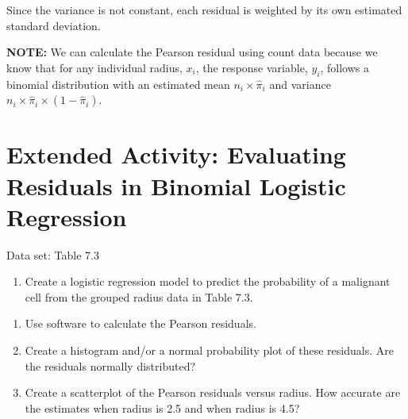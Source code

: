 \documentclass[
]{report}
\providecommand{\tightlist}{%
  \setlength{\itemsep}{0pt}\setlength{\parskip}{0pt}}
\begin{document}
Since the variance is not constant, each residual is weighted by its own estimated standard deviation.

\large

\textbf{NOTE:}
We can calculate the Pearson residual using count data because we know that for any individual radius, \(x_i\), the response variable, \(y_i\), follows a binomial distribution with an estimated mean \(n_i \times \hat\pi_i\) and variance \(n_i \times \hat\pi_i \times (1 - \hat\pi_i)\).\\
\normalsize

\hypertarget{extended-activity-evaluating-residuals-in-binomial-logistic-regression-1}{%
\section*{Extended Activity: Evaluating Residuals in Binomial Logistic Regression}\label{extended-activity-evaluating-residuals-in-binomial-logistic-regression-1}}

Data set: Table 7.3

\begin{enumerate}
\def\labelenumi{\arabic{enumi}.}
\setcounter{enumi}{26}
\tightlist
\item
  Create a logistic regression model to predict the probability of a malignant cell from the grouped radius data in Table 7.3.\\
\end{enumerate}

\begin{enumerate}
\def\labelenumi{\alph{enumi}.}
\tightlist
\item
  Use software to calculate the Pearson residuals.\\
\item
  Create a histogram and/or a normal probability plot of these residuals. Are the residuals normally distributed?\\
\item
  Create a scatterplot of the Pearson residuals versus radius. How accurate are the estimates when radius is 2.5 and when radius is 4.5?
\end{enumerate}
\end{document}
